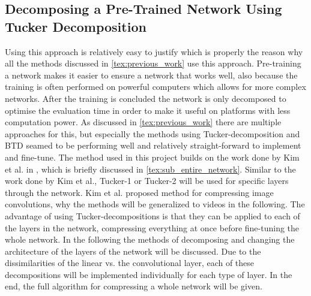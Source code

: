 
\subsection{Decomposing a Pre-Trained Network Using Tucker Decomposition}
Using this approach is relatively easy to justify which is properly the reason why all the methods discussed in \autoref{tex:previous_work} use this approach. Pre-training a network makes it easier to ensure a network that works well, also because the training is often performed on powerful computers which allows for more complex networks. After the training is concluded the network is only decomposed to optimise the evaluation time in order to make it useful on platforms with less computation power. As discussed in \autoref{tex:previous_work} there are multiple approaches for this, but especially the methods using Tucker-decomposition and BTD seamed to be performing well and relatively straight-forward to implement and fine-tune.
The method used in this project builds on the work done by Kim et al. in \cite{Kim2016}, which is briefly discussed in \autoref{tex:sub_entire_network}.  Similar to the work done by Kim et al., Tucker-1 or Tucker-2 will be used for specific layers through the network. Kim et al. proposed method for compressing image convolutions, why the methods will be generalized to videos in the following. The advantage of using Tucker-decompositions is that they can be applied to each of the layers in the network, compressing everything at once before fine-tuning the whole network. In the following the methods of decomposing and changing the architecture of the layers of the network will be discussed. Due to the dissimilarities of the linear vs. the convolutional layer, each of these decompositions will be implemented individually for each type of layer. In the end, the full algorithm for compressing a whole network will be given.

